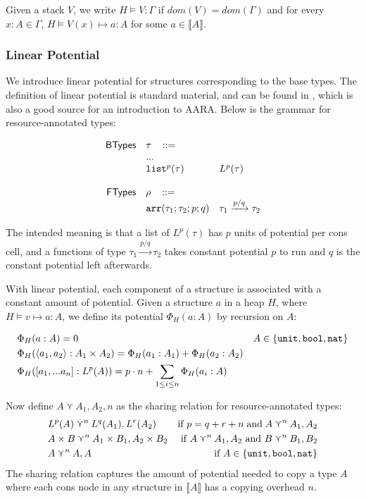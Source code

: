 \documentclass{easychair}
\newcommand{\ms}[1]{\ensuremath{\mathsf{#1}}}
\newcommand{\irl}[1]{\mathtt{#1}}
\theoremstyle{definition}
\begin{document}
Given a stack $V$, we write $H \vDash V : \Gamma$ if $dom(V) = dom(\Gamma)$ and
for every $x : A \in \Gamma$, $H \vDash V(x) \mapsto a : A$ for some $a \in \llbracket A \rrbracket$.

\subsubsection{Linear Potential}
We introduce linear potential for structures corresponding to the base types. The definition of
linear potential is standard material, and can be found in \cite{Hoffmann11}, which is also
a good source for an introduction to AARA. Below is the grammar for resource-annotated types:

\[
\begin{array}{r l l l}
\ms{BTypes} & \tau \,\,\,\,\, ::= \\
	&...\\
	&\irl{list}^p(\tau)		& L^p(\tau)				\\						
  \\
\ms{FTypes} & \rho \,\,\,\,\, ::= \\
	&\irl{arr}(\tau_1;\tau_2;p;q) 				& \tau_1 \xrightarrow{p/q} \tau_2\\ 	
\end{array}
\]

The intended meaning is that a list of $L^p(\tau)$ has $p$ units of potential per 
cons cell, and a functions of type $\tau_1 \xrightarrow{p/q} \tau_2$ takes constant potential 
$p$ to run and $q$ is the constant potential left afterwards.

With linear potential, each component of a structure is associated with a constant amount of 
potential.  Given a structure $a$ in a heap $H$, where  $H \vDash v \mapsto a : A$, we define 
its potential $\Phi_H(a : A)$ by recursion on $A$: 

\begin{align*}
&\Phi_H(a : A) = 0 &A \in \{\unittycst, \booltyabt, \irl{nat}\}\\
&\Phi_H(\pairexcst{a_1}{a_2} : \prodtycst{A_1}{A_2}) = \Phi_H(a_1 : A_1) + \Phi_H(a_2 : A_2)\\
&\Phi_H([a_1,...a_n] : L^p(A)) = p\cdot n + \sum_{1 \le i \le n} \Phi_H(a_i : A)  
\end{align*}

Now define $A \curlyvee A_1,A_2,n$ as the sharing relation for resource-annotated types:
\begin{align*}
	&L^p(A) \curlyvee^n L^q(A_1),L^r(A_2) & \text{if } p = q + r + n \;\text{and}\; 
			A \curlyvee^n A_1,A_2\\
	&\prodtycst{A}{B} \curlyvee^n \prodtycst{A_1}{B_1}, \prodtycst{A_2}{B_2}
		&\text{ if } A \curlyvee^n A_1,A_2 \text{ and } B \curlyvee^n B_1,B_2\\
	&A \curlyvee^n  A,A& \text{ if } A \in \{\unittycst, \booltycst, \irl{nat}\}\\
\end{align*}
The sharing relation captures the amount of potential needed to copy a type $A$ where each 
cons node in any structure in $\llbracket A \rrbracket$ has a copying overhead $n$.
\end{document}
